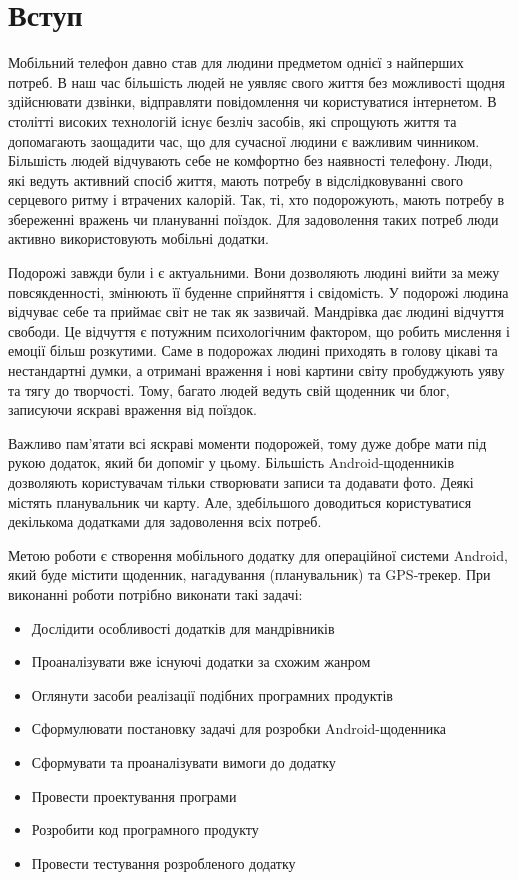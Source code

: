 \documentclass[../main.tex]{subfiles}
\begin{document}
\chapter{Вступ}

Мобільний телефон давно став для людини предметом однієї з найперших потреб. В наш час більшість людей не уявляє свого життя без можливості щодня здійснювати дзвінки, відправляти повідомлення чи користуватися інтернетом. В столітті високих технологій існує безліч засобів, які спрощують життя та допомагають заощадити час, що для сучасної людини є важливим чинником. Більшість людей відчувають себе не комфортно без наявності телефону. Люди, які ведуть активний спосіб життя, мають потребу в відслідковуванні свого серцевого ритму і втрачених калорій. Так, ті, хто подорожують, мають потребу в збереженні вражень чи плануванні поїздок. Для задоволення таких потреб люди активно використовують мобільні додатки.

Подорожі завжди були і є актуальними. Вони дозволяють людині вийти за межу повсякденності, змінюють її буденне сприйняття і свідомість. У подорожі людина відчуває себе та приймає світ не так як зазвичай. Мандрівка дає людині відчуття свободи. Це відчуття є потужним психологічним фактором, що робить мислення і емоції більш розкутими. Саме в подорожах людині приходять в голову цікаві та нестандартні думки, а отримані враження і нові картини світу пробуджують уяву та тягу до творчості. Тому, багато людей ведуть свій щоденник чи блог, записуючи яскраві враження від поїздок. 

Важливо пам'ятати всі яскраві моменти подорожей, тому дуже добре мати під рукою додаток, який би допоміг у цьому. Більшість Android-щоденників дозволяють користувачам тільки створювати записи та додавати фото. Деякі містять планувальник чи карту. Але, здебільшого доводиться користуватися декількома додатками для задоволення всіх потреб.

Метою роботи є створення мобільного додатку для операційної системи Android, який буде містити щоденник, нагадування (планувальник) та GPS-трекер.  
При виконанні роботи потрібно виконати такі задачі:
\begin{itemize}
\item Дослідити особливості додатків для мандрівників
\item Проаналізувати вже існуючі додатки за схожим жанром
\item Оглянути засоби реалізації подібних програмних продуктів
\item Сформулювати постановку задачі для розробки Android-щоденника
\item Сформувати та проаналізувати вимоги до додатку
\item Провести проектування програми
\item Розробити код програмного продукту
\item Провести тестування розробленого додатку
\end{itemize}
\end{document}
